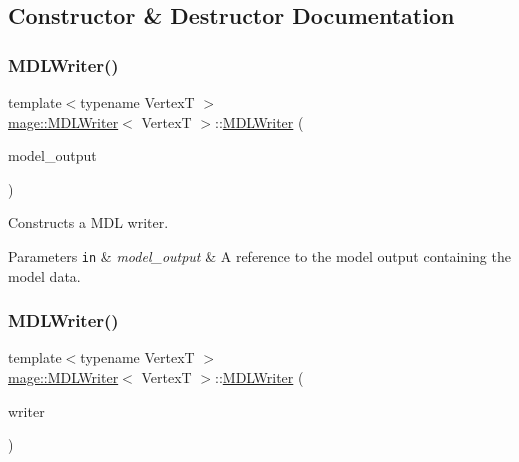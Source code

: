 \subsection{Constructor \& Destructor Documentation}
\hypertarget{classmage_1_1_m_d_l_writer_a7e5c6c9c9a9d32b09c5e17f4691e01c1}{}\label{classmage_1_1_m_d_l_writer_a7e5c6c9c9a9d32b09c5e17f4691e01c1} 
\subsubsection{\texorpdfstring{M\+D\+L\+Writer()}{MDLWriter()}\hspace{0.1cm}{\footnotesize\ttfamily [1/3]}}
{\footnotesize\ttfamily template$<$typename VertexT $>$ \\
\hyperlink{classmage_1_1_m_d_l_writer}{mage\+::\+M\+D\+L\+Writer}$<$ VertexT $>$\+::\hyperlink{classmage_1_1_m_d_l_writer}{M\+D\+L\+Writer} (\begin{DoxyParamCaption}\item[{const \hyperlink{structmage_1_1_model_output}{Model\+Output}$<$ VertexT $>$ \&}]{model\+\_\+output }\end{DoxyParamCaption})\hspace{0.3cm}{\ttfamily [explicit]}}

Constructs a M\+DL writer.


\begin{DoxyParams}[1]{Parameters}
\mbox{\tt in}  & {\em model\+\_\+output} & A reference to the model output containing the model data. \\
\hline
\end{DoxyParams}
\hypertarget{classmage_1_1_m_d_l_writer_ad244168d68c45fe7dcafa350c8a13fbe}{}\label{classmage_1_1_m_d_l_writer_ad244168d68c45fe7dcafa350c8a13fbe} 
\subsubsection{\texorpdfstring{M\+D\+L\+Writer()}{MDLWriter()}\hspace{0.1cm}{\footnotesize\ttfamily [2/3]}}
{\footnotesize\ttfamily template$<$typename VertexT $>$ \\
\hyperlink{classmage_1_1_m_d_l_writer}{mage\+::\+M\+D\+L\+Writer}$<$ VertexT $>$\+::\hyperlink{classmage_1_1_m_d_l_writer}{M\+D\+L\+Writer} (\begin{DoxyParamCaption}\item[{const \hyperlink{classmage_1_1_m_d_l_writer}{M\+D\+L\+Writer}$<$ VertexT $>$ \&}]{writer }\end{DoxyParamCaption})\hspace{0.3cm}{\ttfamily [delete]}}

